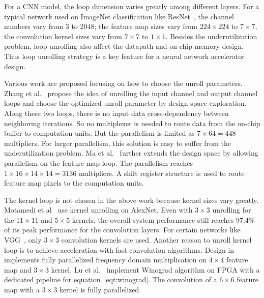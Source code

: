 
For a CNN model, the loop dimension varies greatly among different layers. For a typical network used on ImageNet classification like ResNet~\cite{he2016deep}, the channel numbers vary from 3 to 2048; the feature map sizes vary from $224\times 224$ to $7\times 7$, the convolution kernel sizes vary from $7\times 7$ to $1\times 1$. Besides the underutilization problem, loop unrolling also affect the datapath and on-chip memory design. Thus loop unrolling strategy is a key feature for a neural network accelerator design. 

Various work are proposed focusing on how to choose the unroll parameters. Zhang et al.~\cite{zhang2015optimizing} propose the idea of unrolling the input channel and output channel loops and choose the optimized unroll parameter by design space exploration. Along these two loops, there is no input data cross-dependency between neighboring iterations. So no multiplexer is needed to route data from the on-chip buffer to computation units. But the parallelism is limited as $7\times 64=448$ multipliers. For larger parallelism, this solution is easy to suffer from the underutilization problem. Ma et al.~\cite{ma2017optimizing} further extends the design space by allowing parallelism on the feature map loop. The parallelism reaches $1\times 16\times 14\times 14=3136$ multipliers. A shift register structure is used to route feature map pixels to the computation units.

The kernel loop is not chosen in the above work because kernel sizes vary greatly. Motamedi et al~\cite{motamedi2016design} use kernel unrolling on AlexNet. Even with $3\times 3$ unrolling for the $11\times 11$ and $5\times 5$ kernels, the overall system performance still reaches 97.4\% of its peak performance for the convolution layers. For certain networks like VGG~\cite{simonyan2014very}, only $3\times 3$ convolution kernels are used. Another reason to unroll kernel loop is to achieve acceleration with fast convolution algorithms. Design in \cite{zhang2017frequency} implements fully parallelized frequency domain multiplication on $4\times 4$ feature map and $3\times 3$ kernel. Lu et al.~\cite{lu2017evaluating} implement Winograd algorithm on FPGA with a dedicated pipeline for equation~\ref{eqt:winograd}. The convolution of a $6\times 6$ feature map with a $3\times 3$ kernel is fully parallelized.

